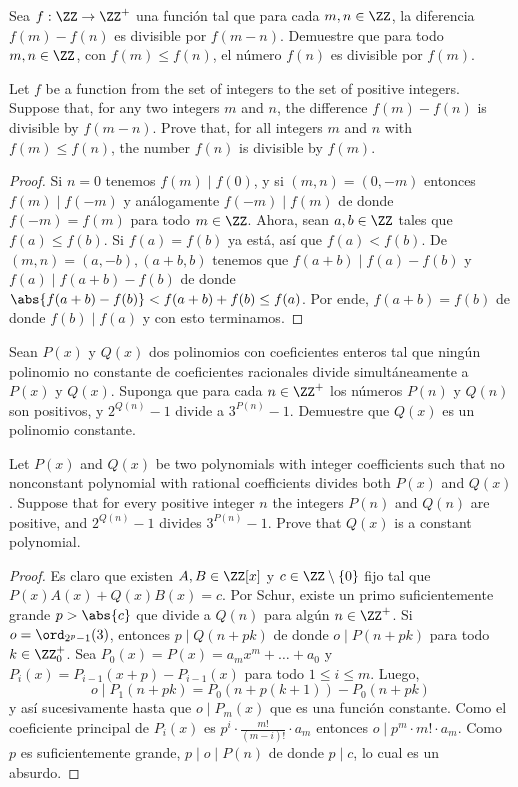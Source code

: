 \begin{probMG}
	Sea $f:\ZZ\to\ZZ^+$ una función tal que para cada $m,n\in\ZZ$, la diferencia $f(m)-f(n)$ es divisible por $f(m-n)$. Demuestre que para todo $m,n\in\ZZ$, con $f(m)\le f(n)$, el número $f(n)$ es divisible por $f(m)$.
	\begin{hint}
		Let $f$ be a function from the set of integers to the set of positive integers. Suppose that, for any two integers $m$ and $n$, the difference $f(m)-f(n)$ is divisible by $f(m-n)$. Prove that, for all integers $m$ and $n$ with $f(m)\le f(n)$, the number $f(n)$ is divisible by $f(m)$.
	\end{hint}
\end{probMG}

\begin{proof}
	Si $n=0$ tenemos $f(m)\mid f(0)$, y si $(m,n)=(0,-m)$ entonces $f(m)\mid f(-m)$ y análogamente $f(-m)\mid f(m)$ de donde $f(-m)=f(m)$ para todo $m\in\ZZ$. Ahora, sean $a,b\in\ZZ$ tales que $f(a)\le f(b)$. Si $f(a)=f(b)$ ya está, así que $f(a)<f(b)$. De $(m,n)=(a,-b),(a+b,b)$ tenemos que $f(a+b)\mid f(a)-f(b)$ y $f(a)\mid f(a+b)-f(b)$ de donde $\abs{f(a+b)-f(b)}<f(a+b)+f(b)\le f(a)$. Por ende, $f(a+b)=f(b)$ de donde $f(b)\mid f(a)$ y con esto terminamos.
\end{proof}

\begin{probMG}[ISL 2011/N6]
	Sean $P(x)$ y $Q(x)$ dos polinomios con coeficientes enteros tal que ningún polinomio no constante de coeficientes racionales divide simultáneamente a $P(x)$ y $Q(x)$. Suponga que para cada $n\in\ZZ^+$ los números $P(n)$ y $Q(n)$ son positivos, y $2^{Q(n)}-1$ divide a $3^{P(n)}-1$. Demuestre que $Q(x)$ es un polinomio constante.
	\begin{hint}
		Let $P(x)$ and $Q(x)$ be two polynomials with integer coefficients such that no nonconstant polynomial with rational coefficients divides both $P(x)$ and $Q(x)$. Suppose that for every positive integer $n$ the integers $P(n)$ and $Q(n)$ are positive, and $2^{Q(n)}-1$ divides $3^{P(n)}-1$. Prove that $Q(x)$ is a constant polynomial.
	\end{hint}
\end{probMG}

\begin{proof}
	Es claro que existen $A,B\in\ZZ[x]$ y $c\in\ZZ\setminus\{0\}$ fijo tal que $P(x)A(x)+Q(x)B(x)=c$. Por Schur, existe un primo suficientemente grande $p>\abs{c}$ que divide a $Q(n)$ para algún $n\in\ZZ^+$. Si $o=\ord_{2^p-1}(3)$, entonces $p\mid Q(n+pk)$ de donde $o\mid P(n+pk)$ para todo $k\in\ZZ^+_0$. Sea $P_0(x)=P(x)=a_mx^m+\dots+a_0$ y $P_i(x)=P_{i-1}(x+p)-P_{i-1}(x)$ para todo $1\le i\le m$. Luego,
	\[o\mid P_1(n+pk)=P_0(n+p(k+1))-P_0(n+pk)\]
	y así sucesivamente hasta que $o\mid P_m(x)$ que es una función constante. Como el coeficiente principal de $P_i(x)$ es $p^i\cdot\frac{m!}{(m-i)!}\cdot a_m$ entonces $o\mid p^m\cdot m!\cdot a_m$. Como $p$ es suficientemente grande, $p\mid o\mid P(n)$ de donde $p\mid c$, lo cual es un absurdo.
\end{proof}

